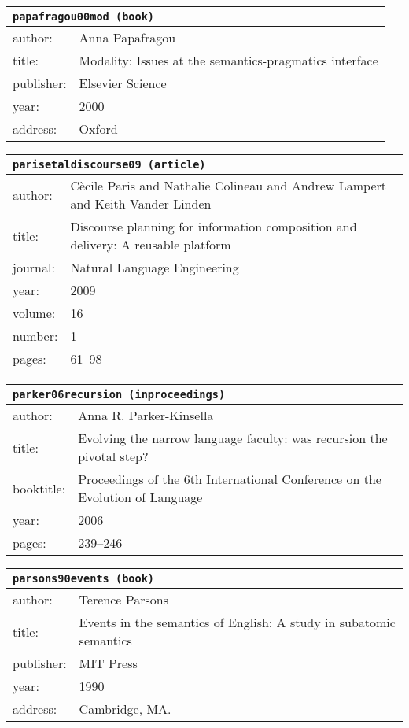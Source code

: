 \documentclass{article}
\begin{document}
\bigskip

\begin{tabular}{p{}p{}}
\multicolumn{2}{l}{\texttt{papafragou00mod (book)}}\\
\hline
author: & Anna Papafragou\\
title: & Modality: Issues at the semantics-pragmatics interface\\
publisher: & Elsevier Science\\
year: & 2000\\
address: & Oxford\\
\end{tabular}

\bigskip

\begin{tabular}{p{}p{}}
\multicolumn{2}{l}{\texttt{parisetaldiscourse09 (article)}}\\
\hline
author: & C{\`e}cile Paris and Nathalie Colineau and Andrew Lampert and Keith Vander Linden\\
title: & Discourse planning for information composition and delivery: A reusable platform\\
journal: & Natural Language Engineering\\
year: & 2009\\
volume: & 16\\
number: & 1\\
pages: & 61--98\\
\end{tabular}

\bigskip

\begin{tabular}{p{}p{}}
\multicolumn{2}{l}{\texttt{parker06recursion (inproceedings)}}\\
\hline
author: & Anna R. Parker-Kinsella\\
title: & Evolving the narrow language faculty: was recursion the pivotal step?\\
booktitle: & Proceedings of the 6th International Conference on the Evolution of Language\\
year: & 2006\\
pages: & 239--246\\
\end{tabular}

\bigskip

\begin{tabular}{p{}p{}}
\multicolumn{2}{l}{\texttt{parsons90events (book)}}\\
\hline
author: & Terence Parsons\\
title: & Events in the semantics of English: A study in subatomic semantics\\
publisher: & MIT Press\\
year: & 1990\\
address: & Cambridge, MA.\\
\end{tabular}
\end{document}
